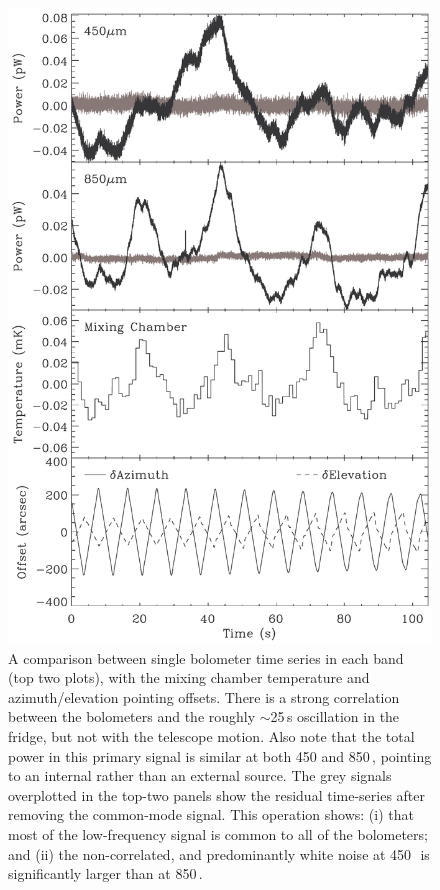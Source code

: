 \documentclass[useAMS,usenatbib,nofootinbib]{mn2e}
\begin{document}
\begin{figure}
\centering
\includegraphics[width=\linewidth]{bolos_point_mix.pdf}
\caption{A comparison between single bolometer time series in each
  band (top two plots), with the mixing chamber temperature and
  azimuth/elevation pointing offsets. There is a strong correlation
  between the bolometers and the roughly $\sim$25\,s oscillation in
  the fridge, but not with the telescope motion. Also note that the
  total power in this primary signal is similar at both 450 and
  850\,\micron, pointing to an internal rather than an external
  source. The grey signals overplotted in the top-two panels show the
  residual time-series after removing the common-mode signal. This
  operation shows: (i) that most of the low-frequency signal is common
  to all of the bolometers; and (ii) the non-correlated, and
  predominantly white noise at 450\,\micron\ is significantly larger
  than at 850\,\micron.}
\label{fig:bolos_mix}
\end{figure}
\end{document}
